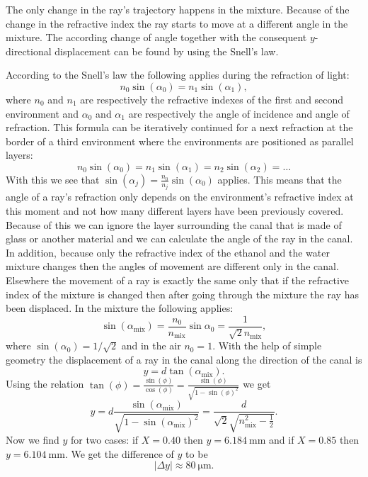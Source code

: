 \hinteng
The only change in the ray’s trajectory happens in the mixture. Because of the change in the refractive index the ray starts to move at a different angle in the mixture. The according change of angle together with the consequent $y$-directional displacement can be found by using the Snell's law.

\solueng
According to the Snell’s law the following applies during the refraction of light:
$$n_0\sin(\alpha_0)=n_1\sin(\alpha_1),$$ 
where $n_0$ and $n_1$ are respectively the refractive indexes of the first and second environment and $\alpha_0$ and $\alpha_1$ are respectively the angle of incidence and angle of refraction. This formula can be iteratively continued for a next refraction at the border of a third environment where the environments are positioned as parallel layers:
$$n_0\sin(\alpha_0)=n_1\sin(\alpha_1)=n_2\sin(\alpha_2) = \dots$$ 
With this we see that $\sin(\alpha_j)=\frac{n_0}{n_j}\sin(\alpha_0)$ applies. This means that the angle of a ray’s refraction only depends on the environment’s refractive index at this moment and not how many different layers have been previously covered. Because of this we can ignore the layer surrounding the canal that is made of glass or another material and we can calculate the angle of the ray in the canal. In addition, because only the refractive index of the ethanol and the water mixture changes then the angles of movement are different only in the canal. Elsewhere the movement of a ray is exactly the same only that if the refractive index of the mixture is changed then after going through the mixture the ray has been displaced. In the mixture the following applies:
$$\sin(\alpha_{\text{mix}})=\frac{n_0}{n_{\text{mix}}}\sin{\alpha_0} = \frac{1}{\sqrt{2}n_{\text{mix}}},$$ 
where $\sin(\alpha_0) = 1/\sqrt{2}$ and in the air $n_0=1$. With the help of simple geometry the displacement of a ray in the canal along the direction of the canal is 
$$y=d\tan(\alpha_{\text{mix}}).$$ 
Using the relation $\tan(\phi) = \frac{\sin(\phi)}{\cos(\phi)} = \frac{\sin(\phi)}{\sqrt{1-\sin(\phi)^2}}$ we get 
$$y = d \frac{\sin(\alpha_{\text{mix}})}{\sqrt{1-\sin(\alpha_{\text{mix}})^2}} = \frac{d}{\sqrt{2}\sqrt{n_{\text{mix}}^2-\frac12}}.$$ 
Now we find $y$ for two cases: if $X=\num{0.40}$ then $y=\SI{6.184}{\milli\meter}$ and if $X=\num{0.85}$ then $y=\SI{6.104}{\milli\meter}$. We get the difference of $y$ to be
$$|\Delta y| \approx \SI{80}{\micro\meter}.$$
\probend